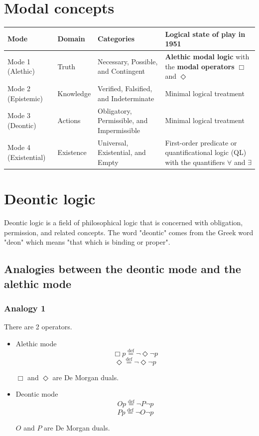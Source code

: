 \documentclass[11pt]{article}
\newcommand{\defequal}{\stackrel{\scriptscriptstyle\mathrm{def}}{=}}
\begin{document}
 \newpage
\section{Modal concepts}
\label{sec:org56d673a}
\begin{center}
\begin{tabularx}{1.2\textwidth}{|X|X|X|X|}
\hline
Mode & Domain & Categories & Logical state of play in 1951\\
\hline
Mode 1 (Alethic) & Truth & Necessary, Possible, and Contingent & \textbf{Alethic modal logic} with the \textbf{modal operators} \(\Box\) and \(\Diamond\)\\
\hline
Mode 2 (Epistemic) & Knowledge & Verified, Falsified, and Indeterminate & Minimal logical treatment\\
\hline
Mode 3 (Deontic) & Actions & Obligatory, Permissible, and Impermissible & Minimal logical treatment\\
\hline
Mode 4 (Existential) & Existence & Universal, Existential, and Empty & First-order predicate or quantificational logic (QL) with the quantifiers \(\forall\) and \(\exists\)\\
\hline
\end{tabularx}
\end{center}

 \newpage
\section{Deontic logic}
\label{sec:orgfe49aef}
Deontic logic is a field of philosophical logic that is concerned with obligation, permission, and related concepts. The word "deontic" comes from the Greek word "deon" which means "that which is binding or proper".
\subsection{Analogies between the deontic mode and the alethic mode}
\label{sec:orgae5d1b7}

\subsubsection{Analogy 1}
\label{sec:org747880a}
There are 2 operators.
\begin{itemize}
\item Alethic mode
\[\Box p \defequal \neg \Diamond \neg p\]
\[\Diamond \defequal \neg \Diamond \neg p\]

\(\Box\) and \(\Diamond\) are De Morgan duals.

\item Deontic mode
\[Op \defequal \neg P \neg p\]
\[Pp \defequal \neg O \neg p\]

\(O\) and \(P\) are De Morgan duals.
\end{itemize}
\end{document}
